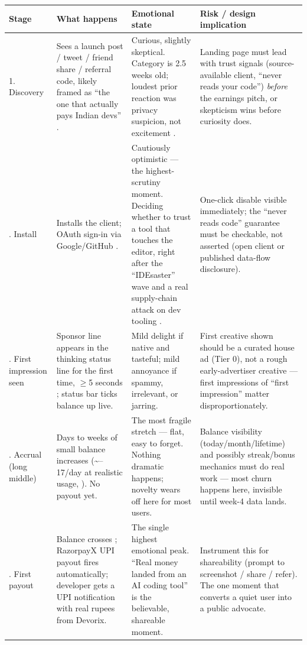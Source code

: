 \begin{table}[htbp]
\centering
\small
\begin{tabular}{@{}p{2.1cm}p{4.6cm}p{2.6cm}p{4.6cm}@{}}
\toprule
\textbf{Stage} & \textbf{What happens} & \textbf{Emotional state} & \textbf{Risk / design implication} \\
\midrule
1. Discovery & Sees a launch post / tweet / friend share / referral code, likely framed as ``the one that actually pays Indian devs'' \cite{mvpspec_2026}. & Curious, slightly skeptical. Category is 2.5 weeks old; loudest prior reaction was privacy suspicion, not excitement \cite{masterplan_2026}. & Landing page must lead with trust signals (source-available client, ``never reads your code'') \emph{before} the earnings pitch, or skepticism wins before curiosity does. \\
\addlinespace
2. Install & Installs the client; OAuth sign-in via Google/GitHub \cite{mvpspec_2026}. & Cautiously optimistic --- the highest-scrutiny moment. Deciding whether to trust a tool that touches the editor, right after the ``IDEsaster'' wave and a real supply-chain attack on dev tooling \cite{masterplan_2026}. & One-click disable visible immediately; the ``never reads code'' guarantee must be checkable, not asserted (open client or published data-flow disclosure). \\
\addlinespace
3. First impression seen & Sponsor line appears in the thinking status line for the first time, $\geq$5 seconds \cite{masterplan_2026}; status bar ticks balance up live. & Mild delight if native and tasteful; mild annoyance if spammy, irrelevant, or jarring. & First creative shown should be a curated house ad (Tier 0), not a rough early-advertiser creative --- first impressions of ``first impression'' matter disproportionately. \\
\addlinespace
4. Accrual (long middle) & Days to weeks of small balance increases (\textasciitilde\textrupee3.5--17/day at realistic usage, \cite{mvpspec_2026}). No payout yet. & The most fragile stretch --- flat, easy to forget. Nothing dramatic happens; novelty wears off here for most users. & Balance visibility (today/month/lifetime) and possibly streak/bonus mechanics \cite{mvpspec_2026} must do real work --- most churn happens here, invisible until week-4 data lands. \\
\addlinespace
5. First payout & Balance crosses \textrupee300; RazorpayX UPI payout fires automatically; developer gets a UPI notification with real rupees from Devorix. & The single highest emotional peak. ``Real money landed from an AI coding tool'' is the believable, shareable moment. & Instrument this for shareability (prompt to screenshot / share / refer). The one moment that converts a quiet user into a public advocate. \\

\end{tabular}
\end{table}
